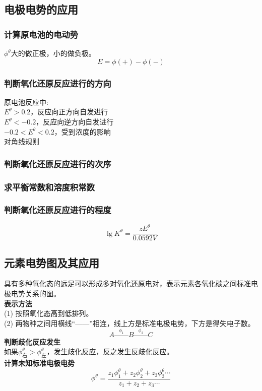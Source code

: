 \documentclass[utf8,a4paper,12pt]{ctexart}
\begin{document}
\subsection{电极电势的应用}
\subsubsection{计算原电池的电动势}
$\phi^{\theta}$大的做正极，小的做负极。\\
\[
E = \phi(+) - \phi(-)
\]
\subsubsection{判断氧化还原反应进行的方向}
原电池反应中:\\
$E^{\theta}>0.2$，反应向正方向自发进行\\
$E^{\theta}<-0.2$，反应向逆方向自发进行\\
$-0.2<E^{\theta}<0.2$，受到浓度的影响\\
对角线规则
\subsubsection{判断氧化还原反应进行的次序}
\subsubsection{求平衡常数和溶度积常数}
\subsubsection{判断氧化还原反应进行的程度}
\begin{equation}
\lg K^{\theta} = \frac{zE^{\theta}}{0.0592V}
\end{equation}
\subsection{元素电势图及其应用}
具有多种氧化态的远足可以形成多对氧化还原电对，表示元素各氧化碳之间标准电极电势关系的图。\\
{\bf 表示方法}\\
(1) 按照氧化态高到低排列。\\
(2) 两物种之间用横线“——”相连，线上方是标准电极电势，下方是得失电子数。\\
\[
A\stackrel{\phi_1}{——}B\stackrel{\phi_2}{——}C
\]
{\bf 判断歧化反应发生}\\
如果$\phi_{\text{右}}^{\theta}>\phi_{\text{左}}^{\theta}$，发生歧化反应，反之发生反歧化反应。\\
{\bf 计算未知标准电极电势}
\[
\phi^{\theta} = \frac{z_1 \phi^{\theta}_1 + z_2 \phi^{\theta}_2 + z_3 \phi^{\theta}_3 \cdots}{z_1 + z_2 +z_3 \cdots}
\]
\newpage
\end{document}
